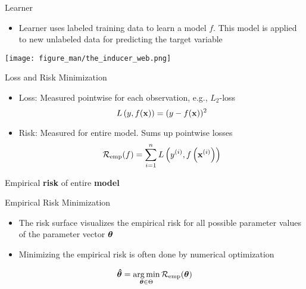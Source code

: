 \documentclass[11pt,compress,t,notes=noshow, xcolor=table]{beamer}
\begin{document}
\begin{frame}{Learner}
\begin{itemize}
\item Learner uses labeled training data to learn a model $f$. This model is applied to new unlabeled data for predicting the target variable
\end{itemize}
 \begin{center}
    \texttt{[image: figure\_man/the\_inducer\_web.png]}
  \end{center}
\end{frame}


\begin{frame}{Loss and Risk Minimization}
\begin{itemize}
  \item Loss: Measured pointwise for each observation, e.g., $L_2$-loss
  $$
  L\left(y, f(\mathbf{x})\right) = (y - f(\mathbf{x}))^2
  $$
  \item Risk: Measured for entire model. Sums up pointwise losses
  $$
  \mathcal{R}_{\text{emp}}(f) = \sum\limits_{i=1}^n L\left(y^{(i)}, f\left(\mathbf{x}^{(i)}\right)\right)
  $$
\end{itemize}
\vfill
{}
{
\center \small Empirical \textbf{risk} of entire \textbf{model}
}
\end{frame}


\begin{frame2}[small]{Empirical Risk Minimization}
\begin{itemize}
\item The risk surface visualizes the empirical risk for all possible parameter values of the parameter vector $\bm{\theta}$
\item Minimizing the empirical risk is often done by numerical optimization
\end{itemize}
$$
\bm{\hat\theta} = \mathop{\mathrm{arg\,min}}_{\bm{\theta} \in \Theta} \mathcal{R}_{\text{emp}}(\bm{\theta})
$$
\end{frame2}


\endlecture
\end{document}

